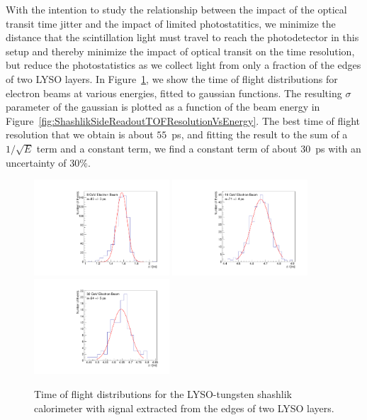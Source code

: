 \documentclass[11pt]{article}
\begin{document}
With the intention to study the relationship between the impact of the 
optical transit time jitter and the impact of limited photostatitics,
we minimize the distance that the scintillation light
must travel to reach the photodetector in this setup and thereby minimize the
impact of optical transit on the time resolution, but reduce the photostatistics 
as we collect light from only a fraction of the edges of two LYSO layers. 
In Figure~\ref{fig:ShashlikSideReadoutTOF}, we show the 
time of flight distributions for electron beams at various energies, 
fitted to gaussian functions. The resulting
$\sigma$ parameter of the gaussian is plotted as a function of the
beam energy in Figure~\ref{fig:ShashlikSideReadoutTOFResolutionVsEnergy}.
The best time of flight resolution that we obtain is about $55$~ps, and
fitting the result to the sum of a $1/\sqrt{E}$ term and a constant term,
we find a constant term of about $30$~ps with an uncertainty of $30\%$. 

\begin{figure}[h] \centering
\includegraphics[width=0.45\textwidth]{figs/TOF_ShashlikSideReadout_Electron_8GeV} 
\includegraphics[width=0.45\textwidth]{figs/TOF_ShashlikSideReadout_Electron_16GeV} 
\includegraphics[width=0.45\textwidth]{figs/TOF_ShashlikSideReadout_Electron_32GeV} 
\caption{ Time of flight distributions for the LYSO-tungsten shashlik calorimeter
with signal extracted from the edges of two LYSO layers. } 
\label{fig:ShashlikSideReadoutTOF}
\end{figure}
\end{document}
